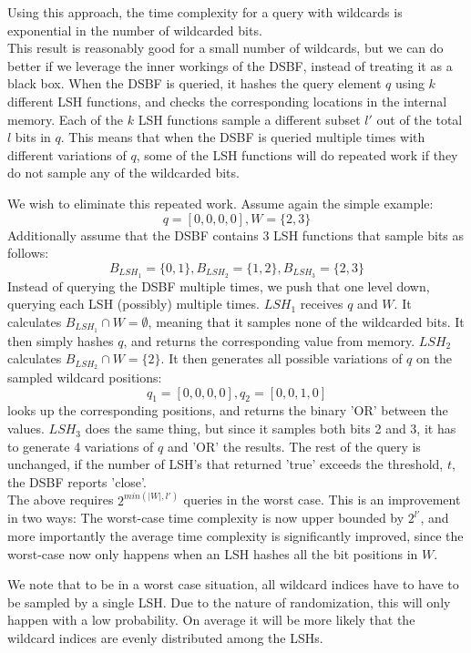 \documentclass[a4paper,11pt]{article}
\begin{document}
Using this approach, the time complexity for a query with wildcards is exponential in the number of wildcarded bits.\\

This result is reasonably good for a small number of wildcards, but we can do better if we leverage the inner workings of the DSBF, instead of treating it as a black box.
When the DSBF is queried, it hashes the query element $q$ using $k$ different LSH functions, and checks the corresponding locations in the internal memory. Each of the $k$ LSH functions sample a different subset $l'$ out of the total $l$ bits in $q$. This means that when the DSBF is queried multiple times with different variations of $q$, some of the LSH functions will do repeated work if they do not sample any of the wildcarded bits.

We wish to eliminate this repeated work. Assume again the simple example:
\[q=[0,0,0,0], W=\{2,3\}\]
Additionally assume that the DSBF contains 3 LSH functions that sample bits as follows:
\[B_{LSH_1}=\{0,1\}, B_{LSH_2}=\{1,2\}, B_{LSH_3}=\{2,3\}\]
Instead of querying the DSBF multiple times, we push that one level down, querying each LSH (possibly) multiple times.
$LSH_1$ receives $q$ and $W$. It calculates $B_{LSH_1} \cap W = \emptyset $, meaning that it samples none of the wildcarded bits. It then simply hashes $q$, and returns the corresponding value from memory.
$LSH_2$ calculates $B_{LSH_2} \cap W = \{2\}$. It then generates all possible variations of $q$ on the sampled wildcard positions:
\[q_1=[0,0,0,0], q_2=[0,0,1,0]\]
looks up the corresponding positions, and returns the binary 'OR' between the values.
$LSH_3$ does the same thing, but since it samples both bits 2 and 3, it has to generate 4 variations of $q$ and 'OR' the results.
The rest of the query is unchanged, if the number of LSH's that returned 'true' exceeds the threshold, $t$, the DSBF reports 'close'.\\

\label{lbl:worst_case}
The above requires $2^{min(|W|, l')}$ queries in the worst case.
This is an improvement in two ways: The worst-case time complexity is now upper bounded by $2^{l'}$, and more importantly the average time complexity is significantly improved, since the worst-case now only happens when an LSH hashes all the bit positions in $W$.

We note that to be in a worst case situation, all wildcard indices have to have to be sampled by a single LSH. Due to the nature of randomization, this will only happen with a low probability. On average it will be more likely that the wildcard indices are evenly distributed among the LSHs.
\end{document}
